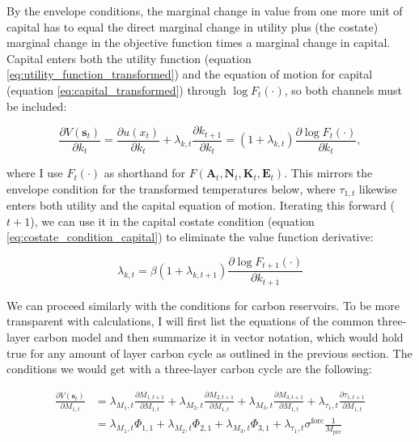 By the envelope conditions, the marginal change in value from one more unit of capital has to equal the direct marginal change in utility plus (the costate) marginal change in the objective function times a marginal change in capital. Capital enters both the utility function (equation \ref{eq:utility_function_transformed}) and the equation of motion for capital (equation \ref{eq:capital_transformed}) through \(\log F_t(\cdot)\), so both channels must be included:

\begin{equation*}
    \frac{\partial V(\bm{s}_t)}{\partial k_t} = \frac{\partial u(x_t)}{\partial k_t} + \lambda_{k,t}\frac{\partial k_{t+1}}{\partial k_t}
    = (1 + \lambda_{k,t}) \frac{\partial \log F_t(\cdot)}{\partial k_t},
\end{equation*}

where I use \(F_t(\cdot)\) as shorthand for \(F(\bm{A}_t,\bm{N}_t,\bm{K}_t,\bm{E}_t)\). This mirrors the envelope condition for the transformed temperatures below, where \(\tau_{1,t}\) likewise enters both utility and the capital equation of motion. Iterating this forward (\(t+1\)), we can use it in the capital costate condition (equation \ref{eq:costate_condition_capital}) to eliminate the value function derivative:

\begin{equation}
    \lambda_{k,t} = \beta (1 + \lambda_{k,t+1}) \frac{\partial \log F_{t+1}(\cdot)}{\partial k_{t+1}}
\label{eq:lagrange_condition_capital_final}
\end{equation}

We can proceed similarly with the conditions for carbon reservoirs. To be more transparent with calculations, I will first list the equations of the common three-layer carbon model and then summarize it in vector notation, which would hold true for any amount of layer carbon cycle as outlined in the previous section. The conditions we would get with a three-layer carbon cycle are the following:

\begin{equation*}
\begin{aligned}
    \frac{\partial V(\bm{s}_t)}{\partial M_{1,t}} &= 
        \lambda_{M_1,t}\frac{\partial M_{1,t+1}}{\partial M_{1,t}}
        + \lambda_{M_2,t}\frac{\partial M_{2,t+1}}{\partial M_{1,t}}
        + \lambda_{M_3,t}\frac{\partial M_{3,t+1}}{\partial M_{1,t}}
        + \lambda_{\tau_1,t}\frac{\partial \tau_{1,t+1}}{\partial M_{1,t}} \\
    &= \lambda_{M_1,t} \Phi_{1,1}
        + \lambda_{M_2,t} \Phi_{2,1}
        + \lambda_{M_3,t} \Phi_{3,1}
        + \lambda_{\tau_1,t} \sigma^{\text{forc}}\frac{1}{M_{\text{pre}}}
\end{aligned}
\end{equation*}

